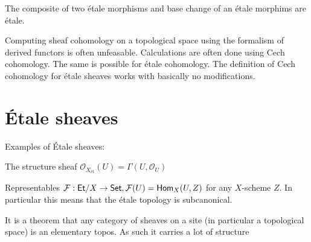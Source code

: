 \begin{proposition}
  The composite of two \'etale morphisms and base change of an \'etale morphims are \'etale.
\end{proposition}

Computing sheaf cohomology on a topological space using the formalism of derived functors is often unfeasable. Calculations are often done using Cech cohomology. The same is possible for \'etale cohomology. The definition of Cech cohomology for \'etale sheaves works with basically no modifications.
\section{\'Etale sheaves}
Examples of \'Etale sheaves:

The structure sheaf $\mathcal{O}_{X_{\text{\'et}}}(U) = \Gamma(U, \mathcal{O}_U)$
\par
Representables $\mathcal{F}: \mathsf{Et}/X \to \mathsf{Set} , \mathcal{F}(U) = \mathsf{Hom}_X(U,Z)$ for any $X$-scheme $Z$. In particular this means that the \'etale topology is subcanonical.
\par

It is a theorem that any category of sheaves on a site (in particular a topological space) is an elementary topos. As such it carries a lot of structure
